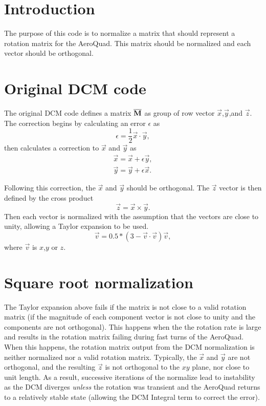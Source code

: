 \documentclass{article}
\def\matrix#1{\overline{\bf{#1}}}
\begin{document}
\section{Introduction}
	The purpose of this code is to normalize a matrix that should represent a rotation matrix for the AeroQuad. This matrix should be normalized and each vector should be orthogonal. 
	
\section{Original DCM code}
The original DCM code defines a matrix $\matrix{M}$ as group of row vector $\vec{x}$,$\vec{y}$,and $\vec{z}$. The correction begins by calculating an error $\epsilon$ as
\begin{equation}
	\epsilon = \frac{1}{2}\vec{x} \cdot \vec{y},
\end{equation}
then calculates a correction to $\vec{x}$ and $\vec{y}$ as 
\begin{eqnarray}
	\vec{x} = \vec{x} + \epsilon\vec{y},\\
	\vec{y} = \vec{y} + \epsilon\vec{x}.	
\end{eqnarray}

Following this correction, the $\vec{x}$ and $\vec{y}$ should be orthogonal. The $\vec{z}$ vector is then defined by the cross product
\begin{equation}
	\vec{z} = \vec{x} \times \vec{y}.
\end{equation}
Then each vector is normalized with the assumption that the vectors are close to unity, allowing a Taylor expansion to be used.
\begin{equation}
	\vec{v} = 0.5 * \left(3 - \vec{v}\cdot\vec{v}\right) \vec{v},
\end{equation}
where $\vec{v}$ is $x$,$y$ or $z$.

\section{Square root normalization}
The Taylor expansion above fails if the matrix is not close to a valid rotation matrix (if the magnitude of each component vector is not close to unity and the components are not orthogonal). This happens when the the rotation rate is large and results in the rotation matrix failing during fast turns of the AeroQuad. When this happens, the rotation matrix output from the DCM normalization is neither normalized nor a valid rotation matrix. Typically, the $\vec{x}$ and $\vec{y}$ are not orthogonal, and the resulting $\vec{z}$ is not orthogonal to the $xy$ plane, nor close to unit length. As a result, successive iterations of the normalize lead to instability as the DCM diverges \textit{unless} the rotation was transient and the AeroQuad returns to a relatively stable state (allowing the DCM Integral term to correct the error).
	
\end{document}
